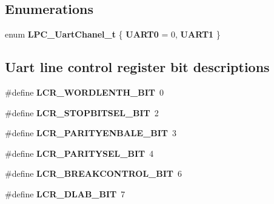 \subsection*{Enumerations}
\begin{DoxyCompactItemize}
\item 
\mbox{\label{group__rtl22xx__uart_ga74adb1e7219d578b01f75fa4d79e3a63}} 
enum {\bfseries L\+P\+C\+\_\+\+Uart\+Chanel\+\_\+t} \{ {\bfseries U\+A\+R\+T0} = 0, 
{\bfseries U\+A\+R\+T1}
 \}
\end{DoxyCompactItemize}
\subsection*{Uart line control register bit descriptions}
\begin{DoxyCompactItemize}
\item 
\mbox{\label{group__rtl22xx__uart_ga9c772414e4bd83bc21685b6baa3822ec}} 
\#define {\bfseries L\+C\+R\+\_\+\+W\+O\+R\+D\+L\+E\+N\+T\+H\+\_\+\+B\+IT}~0
\item 
\mbox{\label{group__rtl22xx__uart_ga819e72354aacd7cec6bd3bb5d2df232b}} 
\#define {\bfseries L\+C\+R\+\_\+\+S\+T\+O\+P\+B\+I\+T\+S\+E\+L\+\_\+\+B\+IT}~2
\item 
\mbox{\label{group__rtl22xx__uart_ga4a8fd5a7cab8ab5b789c514ede7498c5}} 
\#define {\bfseries L\+C\+R\+\_\+\+P\+A\+R\+I\+T\+Y\+E\+N\+B\+A\+L\+E\+\_\+\+B\+IT}~3
\item 
\mbox{\label{group__rtl22xx__uart_ga5fb7255a6d382237196c916e909f14a4}} 
\#define {\bfseries L\+C\+R\+\_\+\+P\+A\+R\+I\+T\+Y\+S\+E\+L\+\_\+\+B\+IT}~4
\item 
\mbox{\label{group__rtl22xx__uart_gaa8a1a90263363e7da6464f3304c4f4d6}} 
\#define {\bfseries L\+C\+R\+\_\+\+B\+R\+E\+A\+K\+C\+O\+N\+T\+R\+O\+L\+\_\+\+B\+IT}~6
\item 
\mbox{\label{group__rtl22xx__uart_gaedb1c7c544ecb5ea9d4f6e30594541c7}} 
\#define {\bfseries L\+C\+R\+\_\+\+D\+L\+A\+B\+\_\+\+B\+IT}~7
\end{DoxyCompactItemize}

